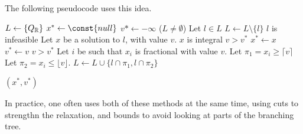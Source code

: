 The following pseudocode uses this idea.

\begin{codebox}
\li $L \gets \{Q_{\mathbb{R}}\}$
\li $x^* \gets \const{null}$
\li $v* \gets -\infty$
\li \While ($L \ne \emptyset$)
 \Do
\li    Let $l \in L$
\li    $L \gets L \setminus \{l\}$
\li    \If $l$ is infeasible
    \Do
\li      {}
    \End
\li    Let $x$ be a solution to $l$, with value $v$.
\li    \If $x$ is integral
    \Do
\li      \If $v > v^*$
         \Do
\li        $x^* \gets x$
\li        $v^* \gets v$
         \End
\li      {}
    \End
\li    \If $v > v^*$
    \Do
\li    Let $i$ be such that $x_i$ is fractional with value $v$.
\li    Let $\pi_1 = x_i \ge \lceil v \rceil$
\li    Let $\pi_2 = x_i \le \lfloor v \rfloor$.
\li    $L \gets L \cup \{l \cap \pi_1, l \cap \pi_2\}$
    \End
  \End

\li \Return $(x^*, v^*)$
\end{codebox}

In practice, one often uses both of these methods at the same time, using cuts to strengthn the relaxation, and bounds to avoid looking at parts of the branching tree.
